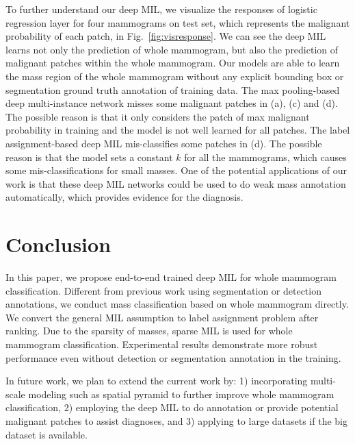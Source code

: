 \documentclass[runningheads,a4paper]{llncs}
\begin{document}
To further understand our deep MIL, we visualize the responses of logistic regression layer for four mammograms on test set, which represents the malignant probability of each patch, in Fig.~\ref{fig:visresponse}. We can see the deep MIL learns not only the prediction of whole mammogram, but also the prediction of malignant patches within the whole mammogram. Our models are able to learn the mass region of the whole mammogram without any explicit bounding box or segmentation ground truth annotation of training data. The max pooling-based deep multi-instance network misses some malignant patches in (a), (c) and (d). The possible reason is that it only considers the patch of max malignant probability in training and the model is not well learned for all patches. The label assignment-based deep MIL mis-classifies some patches in (d). The possible reason is that the model sets a constant $k$ for all the mammograms, which causes some mis-classifications for small masses. One of the potential applications of our work is that these deep MIL networks could be used to do weak mass annotation automatically, which provides evidence for the diagnosis.
\section{Conclusion}\label{sec:con}
In this paper, we propose end-to-end trained deep MIL for whole mammogram classification. Different from previous work using segmentation or detection annotations, we conduct mass classification based on whole mammogram directly. We convert the general MIL assumption to label assignment problem after ranking. Due to the sparsity of masses, sparse MIL is used for whole mammogram classification. Experimental results demonstrate more robust performance even without detection or segmentation annotation in the training. %

In future work, we plan to extend the current work by: 1) incorporating multi-scale modeling such as spatial pyramid to further improve whole mammogram classification, 2) employing the deep MIL to do annotation or provide potential malignant patches to assist diagnoses, and 3) applying to large datasets if the big dataset is available. %

\small{}
\end{document}

